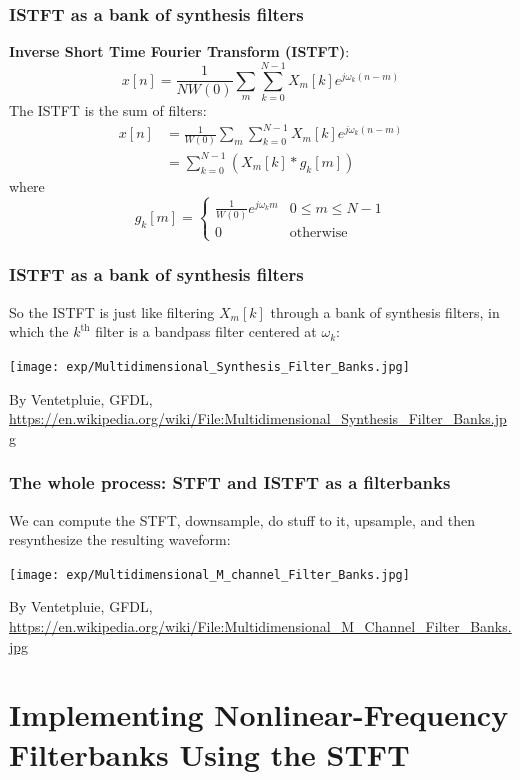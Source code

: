 \documentclass{beamer}
\begin{document}
\begin{frame}
  \frametitle{ISTFT as a bank of synthesis filters}

  {\bf Inverse Short Time Fourier Transform (ISTFT)}:
  \[
  x[n] = \frac{1}{NW(0)}\sum_m\sum_{k=0}^{N-1} X_m[k]e^{j\omega_k (n-m)}
  \]
  The ISTFT is the sum of filters:
  \begin{align*}
    x[n] &= \frac{1}{W(0)}\sum_m\sum_{k=0}^{N-1} X_m[k]e^{j\omega_k (n-m)}\\
    &= \sum_{k=0}^{N-1} \left( X_m[k] \ast g_k[m]\right)
  \end{align*}
  where
  \[
  g_k[m] = \begin{cases}
    \frac{1}{W(0)}e^{j\omega_k m} & 0\le m\le N-1\\
    0 & \mbox{otherwise}
  \end{cases}
  \]
\end{frame}

\begin{frame}
  \frametitle{ISTFT as a bank of synthesis filters}

  So the ISTFT is just like filtering $X_m[k]$ through a bank of synthesis
  filters, in which the $k^{\textrm{th}}$ filter is a bandpass filter
  centered at $\omega_k$:
  \centerline{\texttt{[image: exp/Multidimensional\_Synthesis\_Filter\_Banks.jpg]}}
  \begin{tiny}
    By Ventetpluie, GFDL,
    \url{https://en.wikipedia.org/wiki/File:Multidimensional_Synthesis_Filter_Banks.jpg}
  \end{tiny}
\end{frame}
  
\begin{frame}
  \frametitle{The whole process: STFT and ISTFT as a filterbanks}

  We can compute the STFT, downsample, do stuff to it, upsample, and then resynthesize the
  resulting waveform:
  \centerline{\texttt{[image: exp/Multidimensional\_M\_channel\_Filter\_Banks.jpg]}}
  \begin{tiny}
    By Ventetpluie, GFDL,
    \url{https://en.wikipedia.org/wiki/File:Multidimensional_M_Channel_Filter_Banks.jpg}
  \end{tiny}
\end{frame}
  
\section[Nonlinear Frequency]{Implementing Nonlinear-Frequency Filterbanks Using the STFT}
\setcounter{subsection}{1}
\end{document}
